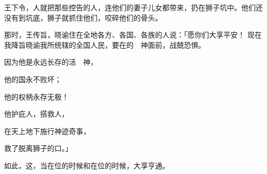 {王下令，人就把那些控告{}的人，连他们的妻子儿女都带来，扔在狮子坑中。他们还没有到坑底，狮子就抓住他们，咬碎他们的骨头。
\par }{\PP {}那时，{}王传旨，晓谕住在全地各方、各国、各族的人说：「愿你们大享平安！
现在我降旨晓谕我所统辖的全国人民，要在{}的　神面前，战兢恐惧。
\par }{\Q 因为他是永远长存的活　神，
\par }{\Q 他的国永不败坏；
\par }{\Q 他的权柄永存无极！
\par }{\Q {}他护庇人，搭救人，
\par }{\Q 在天上地下施行神迹奇事，
\par }{\Q 救了{}脱离狮子的口。」
\par }{\PP {}如此，这{}，当{}{}在位的时候和{}{}{}在位的时候，大享亨通。

}
